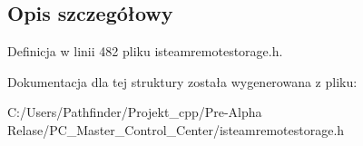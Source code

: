\subsection{Opis szczegółowy}


Definicja w linii 482 pliku isteamremotestorage.\+h.



Dokumentacja dla tej struktury została wygenerowana z pliku\+:\begin{DoxyCompactItemize}
\item 
C\+:/\+Users/\+Pathfinder/\+Projekt\+\_\+cpp/\+Pre-\/\+Alpha Relase/\+P\+C\+\_\+\+Master\+\_\+\+Control\+\_\+\+Center/isteamremotestorage.\+h\end{DoxyCompactItemize}
